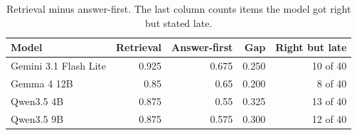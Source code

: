 \begin{table}[htbp]
\centering
\caption{Retrieval minus answer-first. The last column counts items the model got right but stated late.}
\label{tab:gap}
{\small
\begin{tabular}{@{}lrrrr@{}}
\toprule
Model & Retrieval & Answer-first & Gap & Right but late \\
\midrule
Gemini 3.1 Flash Lite & 0.925 & 0.675 & 0.250 & 10 of 40 \\
Gemma 4 12B & 0.85 & 0.65 & 0.200 & 8 of 40 \\
Qwen3.5 4B & 0.875 & 0.55 & 0.325 & 13 of 40 \\
Qwen3.5 9B & 0.875 & 0.575 & 0.300 & 12 of 40 \\
\bottomrule
\end{tabular}}
\end{table}
